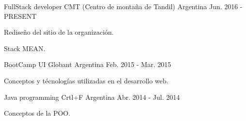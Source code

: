 


\begin{cventries}

\cventry
{FullStack developer} %
{CMT (Centro de montaña de Tandil)} %
{Argentina} %
{Jun. 2016 - PRESENT} %
{ %
\begin{cvitems}
\item {Rediseño del sitio de la organización.}
\item {Stack MEAN.}
\end{cvitems}
}




\cventry
{BootCamp UI} %
{Globant} %
{Argentina} %
{Feb. 2015 - Mar. 2015} %
{ %
\begin{cvitems}
\item {Conceptos y técnologías utilizadas en el desarrollo web.}
\end{cvitems}
}


\cventry
{Java programming} %
{Crtl+F} %
{Argentina} %
{Abr. 2014 - Jul. 2014} %
{ %
\begin{cvitems}
\item {Conceptos de la POO.}
\end{cvitems}
}


\end{cventries}
